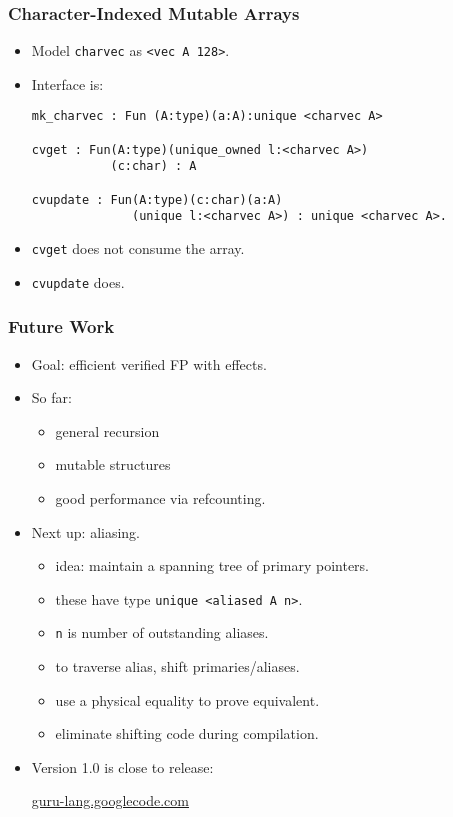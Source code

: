 \documentclass[11pt]{beamer}
\begin{document}
\begin{frame}[containsverbatim]
\frametitle{Character-Indexed Mutable Arrays}

\begin{itemize}
\item Model \texttt{charvec} as \texttt{<vec A 128>}.
\item Interface is: 


{\footnotesize
\begin{verbatim}
mk_charvec : Fun (A:type)(a:A):unique <charvec A>

cvget : Fun(A:type)(unique_owned l:<charvec A>)
           (c:char) : A

cvupdate : Fun(A:type)(c:char)(a:A)
              (unique l:<charvec A>) : unique <charvec A>.
\end{verbatim}
}

\item \texttt{cvget} does not consume the array.

\item \texttt{cvupdate} does.

\end{itemize}


\end{frame}

\begin{frame}
\frametitle{Future Work}

\begin{itemize}
\item Goal: efficient verified FP with effects.
\item So far: 
\begin{itemize}
\item general recursion
\item mutable structures
\item good performance via refcounting.
\end{itemize}
\item Next up: aliasing.
\begin{itemize}
\item idea: maintain a spanning tree of primary pointers.
\item these have type \texttt{unique <aliased A n>}.
\item \texttt{n} is number of outstanding aliases.
\item to traverse alias, shift primaries/aliases.
\item use a physical equality to prove equivalent.
\item eliminate shifting code during compilation.
\end{itemize}
\item Version 1.0 is close to release:

\begin{center}
\url{guru-lang.googlecode.com}
\end{center}

\end{itemize}

\end{frame}
\end{document}
